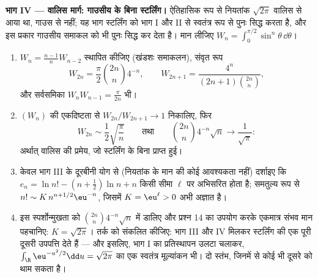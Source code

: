 \begin{problem}
\medskip
\noindent\textbf{भाग IV --- वालिस मार्ग: गाउसीय के बिना
स्टर्लिंग।} ऐतिहासिक रूप से नियतांक $\sqrt{2\pi}$ वालिस से आया था,
गाउस से नहीं; यह भाग स्टर्लिंग को भाग I और II से स्वतंत्र रूप से
पुनः सिद्ध करता है, और इस प्रकार गाउसीय समाकल को भी पुनः सिद्ध कर
देता है। मान लीजिए $W_n = \int_0^{\pi/2}\sin^n\theta\,
\dd\theta$।
\begin{enumerate}[resume]
  \item $W_n = \frac{n-1}nW_{n-2}$ स्थापित कीजिए (खंडशः समाकलन), संवृत रूप
        \[
        W_{2n} = \frac\pi2\binom{2n}n4^{-n}, \qquad
        W_{2n+1} = \frac{4^n}{(2n+1)\binom{2n}n},
        \]
        और सर्वसमिका $W_nW_{n-1} = \frac\pi{2n}$ भी।
  \item $(W_n)$ की एकदिष्टता से $W_{2n}/W_{2n+1} \to 1$ निकालिए, फिर
        \[
        W_{2n} \sim \frac12\sqrt{\frac\pi n}
        \qquad\text{तथा}\qquad
        \binom{2n}n4^{-n}\sqrt n \longrightarrow
        \frac1{\sqrt\pi} :
        \]
        अर्थात् वालिस की प्रमेय, जो स्टर्लिंग के बिना प्राप्त हुई।
  \item केवल भाग III के दूरबीनी योग से (नियतांक के मान की कोई
        आवश्यकता नहीं) दर्शाइए कि $e_n = \ln n! - (n +
        \frac12)\ln n + n$ किसी सीमा $\ell$ पर
        अभिसरित होता है; समतुल्य रूप से $n! \sim K\,n^{n+1/2}\eu^{-n}$, जिसमें $K =
        \eu^\ell > 0$ अभी
        अज्ञात है।
  \item इस स्पर्शोन्मुखता को $\binom{2n}n4^{-n}\sqrt n$ में डालिए और प्रश्न 14 का
        उपयोग करके एकमात्र संभव मान पहचानिए: $K = \sqrt{2\pi}$। तर्क को
        संकलित कीजिए: भाग III और IV मिलकर स्टर्लिंग की एक पूरी
        दूसरी उपपत्ति देते हैं --- और इसलिए, भाग I का प्रतिस्थापन
        उलटा चलाकर, $\int_\R\eu^{-u^2/2}\dd u = \sqrt{2\pi}$ का एक स्वतंत्र मूल्यांकन भी। दो स्तंभ,
        जिनमें से कोई भी दूसरे को थाम सकता है।
\end{enumerate}


\end{problem}
